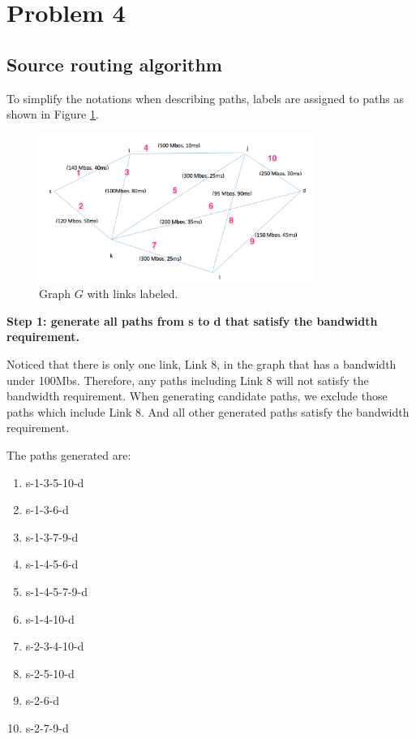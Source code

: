 \section{Problem 4}
\subsection{Source routing algorithm}

To simplify the notations when describing paths, labels are assigned to paths as shown in Figure \ref{fig:graph}.

\begin{figure}[h]
    \centering
    \includegraphics[width=0.8\textwidth]{labeled.png}
    \caption{Graph $G$ with links labeled.}
    \label{fig:graph}
\end{figure}

\textbf{Step 1: generate all paths from s to d that satisfy the bandwidth requirement.}

Noticed that there is only one link, Link 8, in the graph that has a bandwidth under 100Mbs. Therefore, any paths including Link 8 will not satisfy the bandwidth requirement. When generating candidate paths, we exclude those paths which include Link 8. And all other generated paths satisfy the bandwidth requirement.

The paths generated are:
\begin{enumerate}
\item s-1-3-5-10-d
\item s-1-3-6-d
\item s-1-3-7-9-d
\item s-1-4-5-6-d
\item s-1-4-5-7-9-d
\item s-1-4-10-d
\item s-2-3-4-10-d
\item s-2-5-10-d
\item s-2-6-d
\item s-2-7-9-d
\end{enumerate}

